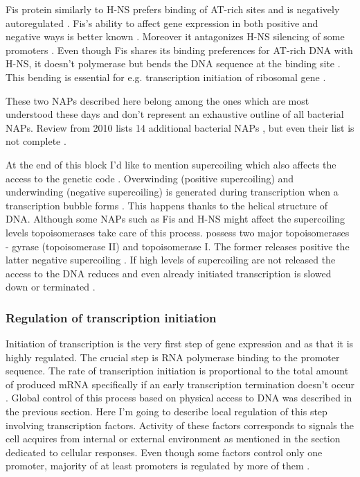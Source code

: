 Fis protein similarly to H-NS prefers binding of AT-rich sites and is negatively autoregulated \cite{ball1992dramatic, stella2010shape}.
Fis's ability to affect gene expression in both positive and negative ways is better known \cite{choi2005effects, karambelkar2012silencing}.
Moreover it antagonizes H-NS silencing of some promoters \cite{falconi2001involvement}.
Even though Fis shares its binding preferences for AT-rich DNA with H-NS, it doesn't polymerase but bends the DNA sequence at the binding site \cite{hubner1989bent}.
This bending is essential for e.g. transcription initiation of ribosomal gene  \cite{gosink1993dna}.

These two NAPs described here belong among the ones which are most understood these days and don't represent an exhaustive outline of all bacterial NAPs.
Review from 2010 lists 14 additional bacterial NAPs \cite{dillon2010bacterial}, but even their list is not complete \cite{aznar2013hha}.

At the end of this block I'd like to mention supercoiling which also affects the access to the genetic code \cite{brahms1985activation}.
Overwinding (positive supercoiling) and underwinding (negative supercoiling) is generated during transcription when a transcription bubble forms \cite{wu1988transcription}.
This happens thanks to the helical structure of DNA.
Although some NAPs such as Fis and H-NS might affect the supercoiling levels \cite{ouafa2012nucleoid} topoisomerases take care of this process.
 possess two major topoisomerases - gyrase (topoisomerase II) and topoisomerase I.
The former releases positive the latter negative supercoiling \cite{wang1971interaction, gellert1976dna}.
If high levels of supercoiling are not released the access to the DNA reduces and even already initiated transcription is slowed down or terminated \cite{chong2014mechanism}.

\subsubsection{Regulation of transcription initiation}
Initiation of transcription is the very first step of gene expression and as that it is highly regulated.
The crucial step is RNA polymerase binding to the promoter sequence.
The rate of transcription initiation is proportional to the total amount of produced mRNA specifically if an early transcription termination doesn't occur \cite{kennell1977transcription, iyer1996absolute}.
Global control of this process based on physical access to DNA was described in the previous section.
Here I'm going to describe local regulation of this step involving transcription factors.
Activity of these factors corresponds to signals the cell acquires from internal or external environment as mentioned in the section dedicated to cellular responses.
Even though some factors control only one promoter, majority of at least  promoters is regulated by more of them \cite{karp2014ecocyc}.

